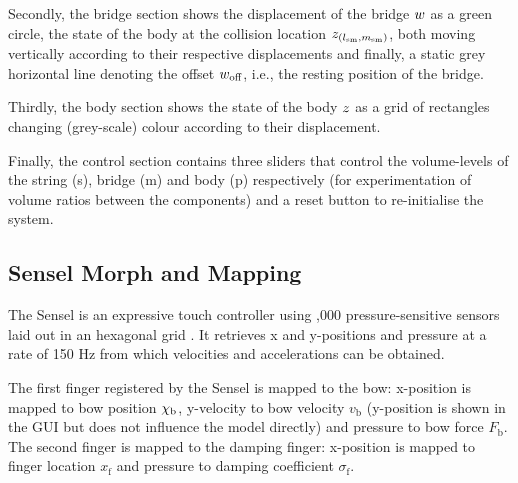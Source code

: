     Secondly, the bridge section shows the displacement of the bridge $w$ as a green circle, the state of the body at the collision location $z_{(l_\text{sm},m_\text{sm})}$, both moving vertically according to their respective displacements and finally, a static grey horizontal line denoting the offset $w_\text{off}$, i.e., the resting position of the bridge.
    
    Thirdly, the body section shows the state of the body $z$ as a grid of rectangles changing (grey-scale) colour according to their displacement.
    
    Finally, the control section contains three sliders that control the volume-levels of the string (s), bridge (m) and body (p) respectively (for experimentation of volume ratios between the components) and a reset button to re-initialise the system. 
    
    \subsection{Sensel Morph and Mapping}
    The Sensel is an expressive touch controller using ,000 pressure-sensitive sensors laid out in an hexagonal grid \cite{sensel2020}. It retrieves x and y-positions and pressure at a rate of 150 Hz from which velocities and accelerations can be obtained.
    
    The first finger registered by the Sensel is mapped to the bow: x-position is mapped to bow position $\chi_\text{b}$, y-velocity to bow velocity $v_\text{b}$ (y-position is shown in the GUI but does not influence the model directly) and pressure to bow force $F_\text{b}$. The second finger is mapped to the damping finger: x-position is mapped to finger location $x_\text{f}$ and pressure to damping coefficient $\sigma_\text{f}$.
    
